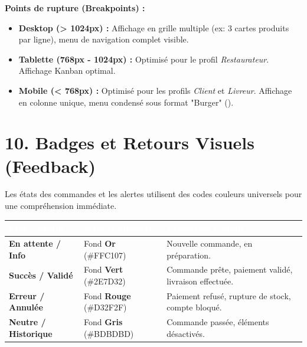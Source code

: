 \documentclass[12pt,a4paper]{article}
\begin{document}
\textbf{Points de rupture (Breakpoints) :}
\begin{itemize}[label=\textcolor{GrillRed}{\faDesktop}]
    \item \textbf{Desktop (> 1024px) :} Affichage en grille multiple (ex: 3 cartes produits par ligne), menu de navigation complet visible.
    \item \textbf{Tablette (768px - 1024px) :} Optimisé pour le profil \textit{Restaurateur}. Affichage Kanban optimal.
    \item \textbf{Mobile (< 768px) :} Optimisé pour les profils \textit{Client} et \textit{Livreur}. Affichage en colonne unique, menu condensé sous format "Burger" (\faBars).
\end{itemize}

\section{10. Badges et Retours Visuels (Feedback)}
Les états des commandes et les alertes utilisent des codes couleurs universels pour une compréhension immédiate.

\begin{center}
\renewcommand{\arraystretch}{1.6}
\begin{tabular}{|m{4.5cm}|m{4cm}|m{6cm}|}
    \hline
    \rowcolor{CoalBlack} \textcolor{white}{\textbf{État / Statut}} & \textcolor{white}{\textbf{Style (Couleurs)}} & \textcolor{white}{\textbf{Utilisation typique}} \\
    \hline
    \textbf{En attente / Info} & Fond \textcolor{FryGold}{\textbf{Or}} (\#FFC107) & Nouvelle commande, en préparation. \\
    \hline
    \textbf{Succès / Validé} & Fond \textcolor{SuccessGreen}{\textbf{Vert}} (\#2E7D32) & Commande prête, paiement validé, livraison effectuée. \\
    \hline
    \textbf{Erreur / Annulée} & Fond \textcolor{GrillRed}{\textbf{Rouge}} (\#D32F2F) & Paiement refusé, rupture de stock, compte bloqué. \\
    \hline
    \textbf{Neutre / Historique} & Fond \textcolor{StoneGray}{\textbf{Gris}} (\#BDBDBD) & Commande passée, éléments désactivés. \\
    \hline
\end{tabular}
\end{center}
\end{document}
